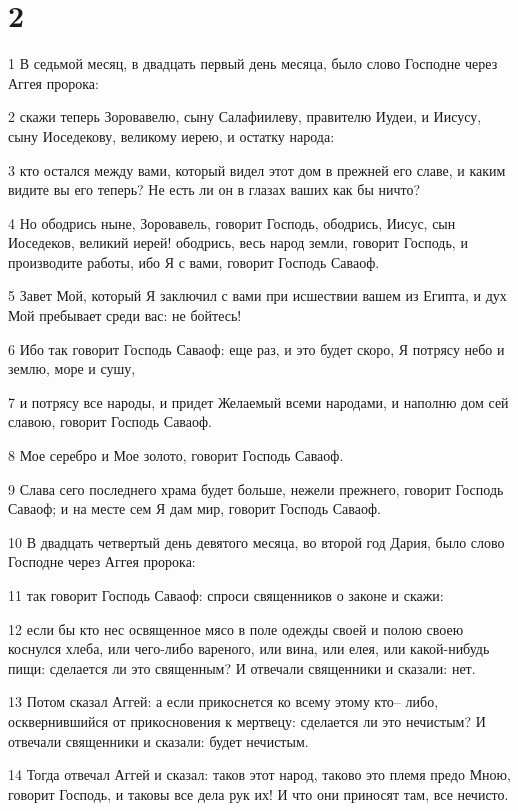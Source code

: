 \chapter{2}

\par 1 В седьмой месяц, в двадцать первый день месяца, было слово Господне через Аггея пророка:
\par 2 скажи теперь Зоровавелю, сыну Салафиилеву, правителю Иудеи, и Иисусу, сыну Иоседекову, великому иерею, и остатку народа:
\par 3 кто остался между вами, который видел этот дом в прежней его славе, и каким видите вы его теперь? Не есть ли он в глазах ваших как бы ничто?
\par 4 Но ободрись ныне, Зоровавель, говорит Господь, ободрись, Иисус, сын Иоседеков, великий иерей! ободрись, весь народ земли, говорит Господь, и производите работы, ибо Я с вами, говорит Господь Саваоф.
\par 5 Завет Мой, который Я заключил с вами при исшествии вашем из Египта, и дух Мой пребывает среди вас: не бойтесь!
\par 6 Ибо так говорит Господь Саваоф: еще раз, и это будет скоро, Я потрясу небо и землю, море и сушу,
\par 7 и потрясу все народы, и придет Желаемый всеми народами, и наполню дом сей славою, говорит Господь Саваоф.
\par 8 Мое серебро и Мое золото, говорит Господь Саваоф.
\par 9 Слава сего последнего храма будет больше, нежели прежнего, говорит Господь Саваоф; и на месте сем Я дам мир, говорит Господь Саваоф.
\par 10 В двадцать четвертый день девятого месяца, во второй год Дария, было слово Господне через Аггея пророка:
\par 11 так говорит Господь Саваоф: спроси священников о законе и скажи:
\par 12 если бы кто нес освященное мясо в поле одежды своей и полою своею коснулся хлеба, или чего-либо вареного, или вина, или елея, или какой-нибудь пищи: сделается ли это священным? И отвечали священники и сказали: нет.
\par 13 Потом сказал Аггей: а если прикоснется ко всему этому кто-- либо, осквернившийся от прикосновения к мертвецу: сделается ли это нечистым? И отвечали священники и сказали: будет нечистым.
\par 14 Тогда отвечал Аггей и сказал: таков этот народ, таково это племя предо Мною, говорит Господь, и таковы все дела рук их! И что они приносят там, все нечисто.
